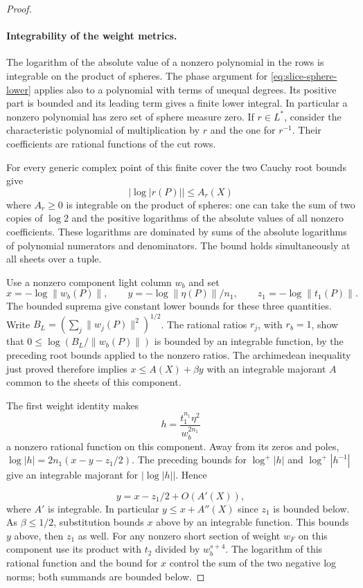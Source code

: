 \begin{proof}
\paragraph{Integrability of the weight metrics.}
The logarithm of the absolute value of a nonzero polynomial
in the rows is integrable on the product of spheres. The
phase argument for \eqref{eq:slice-sphere-lower} applies
also to a polynomial with terms of unequal degrees. Its
positive part is bounded and its leading term gives a finite
lower integral. In particular a nonzero polynomial has zero
set of sphere measure zero. If \(r\in L^*\), consider the
characteristic polynomial of multiplication by \(r\) and the
one for \(r^{-1}\). Their coefficients are rational
functions of the cut rows.

For every generic complex
point of this finite cover the two Cauchy root bounds give
\[
          |\log |r(P)||\le A_r(X)
\]
where \(A_r\ge0\) is integrable on the product of spheres:
one can take the sum of two copies of \(\log 2\) and the
positive logarithms of the absolute values of all nonzero
coefficients. These logarithms are dominated by sums of the
absolute logarithms of polynomial numerators and denominators.
The bound holds simultaneously at all sheets over a tuple.

Use a nonzero component light column \(w_b\) and set
\[
 x=-\log\|w_b(P)\|,\qquad
 y=-\log\|\eta(P)\|/n_1,\qquad z_1=-\log\|t_1(P)\| .
\]
The bounded suprema give constant lower bounds for these
three quantities. Write \(B_L=(\sum_j\|w_j(P)\|^2)^{1/2}\).
The rational ratios \(r_j\), with \(r_b=1\), show that
\(0\le\log(B_L/\|w_b(P)\|)\) is bounded by an integrable
function, by the preceding root bounds applied to the
nonzero ratios. The archimedean inequality just proved
therefore implies \(x\le A(X)+\beta y\) with an integrable
majorant \(A\) common to the sheets of this component.

The first weight identity makes
\[
 h=\frac{t_1^{n_1}\eta^2}{w_b^{2n_1}}
\]
a nonzero rational function on this component. Away from its zeros and
poles, \(\log|h|=2n_1(x-y-z_1/2)\). The preceding bounds for
\(\log^+|h|\) and \(\log^+|h^{-1}|\) give an integrable majorant
for \(\bigl|\log|h|\bigr|\). Hence

\[
  y=x-z_1/2+O(A'(X)),
\]
 where \(A'\) is integrable.
In particular \(y\le x+A''(X)\) since \(z_1\) is bounded
below. As \(\beta\le1/2\), substitution bounds \(x\)
above by an integrable function. This bounds \(y\) above,
then \(z_1\) as well. For any nonzero short section of
weight \(w_F\) on this component use its product with \(t_2\)
divided by \(w_b^{s+4}\). The logarithm of this rational
function and the bound for \(x\) control the sum of the
two negative log norms; both summands are bounded below.


\end{proof}
